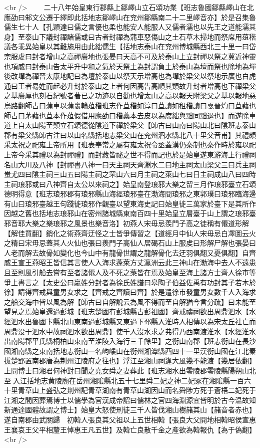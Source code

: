 <br />
　　二十八年始皇東行郡縣上鄒嶧山立石頌功業【班志魯國鄒縣嶧山在北應劭曰邾文公遷于繹即此括地志鄒嶧山在兖州鄒縣南二十二里嶧音亦】於是召集魯儒生七十人【孔穎達曰儒之言優也柔也能安人能服人又儒者濡也以先王之道能濡其身】至泰山下議封禪諸儒或曰古者封禪為蒲車惡傷山之土石草木掃地而祭席用葅稭議各乖異始皇以其難施用由此絀儒生【括地志泰山在兖州博城縣西北三十里一曰岱宗服䖍曰封者增山之高禪廣地也張晏曰天高不可及於泰山上立封禪以祭之冀近神靈也項威曰封泰山告太平升中和之氣於天祭土為封謂負土於泰山為壇而祭也除地為墠後改墠為禪晉太康地記曰為壇於泰山以祭天示增高也為墠於梁父以祭地示廣也白虎通曰王者易姓而起必升封於泰山之上者何因高告高順其類故升封者增高也下禪梁父之基廣厚也刻石紀號者著已之功迹以自勸也增太山之高以報天附梁父之基以報地惡烏路翻師古曰蒲車以蒲裹輪葅稭班志作苴稭如淳曰苴讀如租稭讀曰戛晉灼曰苴藉也師古曰茅藉也苴本作葅假借用應劭曰稭藁本去皮以為席絀與黜同黜退也】而遂除車道上自太山陽至顛立石頌德從隂道下禪於梁父【師古曰山南曰陽山北曰隂班志泰山郡有梁父縣師古注曰以山名縣括地志梁父山在兖州泗水縣北八十里父音甫】其禮頗采太祝之祀雍上帝所用【班表奉常之屬有雍太祝令丞蓋漢仍秦制也秦作畤於雍以祀上帝今采其禮以為封禪禮】而封藏皆祕之世不得而記也於是始皇遂東游海上行禮祠名山大川及八神【封禪書八神一曰天主祠天齊淵水二曰地主祠太山梁父三曰兵主祠蚩尤四曰隂主祠三山五曰陽主祠之罘山六曰月主祠之萊山七曰日主祠成山八曰四時主祠琅邪或曰八神齊自太公以來祠之】始皇南登琅邪大樂之留三月作琅邪臺立石頌德明得意【班志琅邪郡有琅邪縣山海經琅邪臺在渤海間琅邪之東郭璞曰琅邪臨海邊有山曰琅邪臺越王句踐徙琅邪作觀臺以望東海史記曰始皇徙三萬家於臺下是其所作因越之舊也括地志琅邪山在密州諸城縣東南百四十里始皇立層臺于山上謂之琅邪臺邪音耶大樂之樂琅邪之風景也樂音洛】初燕人宋毋忌羨門子高之徒稱有僊道形解【解佳買翻】銷化之術燕齊迂怪之士皆爭傳習之【道經月中仙人宋毋忌白凙圖云火之精曰宋毋忌蓋其人火仙也張曰羨門子高仙人居碣石山上服䖍曰形解尸解也張晏曰人老而解去故骨如變化也今山中有龍骨世謂之龍解骨化去迂羽俱翻又憂俱翻】自齊威王宣王燕昭王皆信其言使人入海求蓬萊方丈瀛洲云此三神山在渤海中去人不遠患且至則風引船去嘗有至者諸僊人及不死之藥皆在焉及始皇至海上諸方士齊人徐市等爭上書言之【太史公曰嬴姓分封者為徐氏姓譜曰皋陶子伯益佐禹有功封其子若木於徐】請得齊戒與童男女求之【齊戒之齊讀曰齊】於是遣徐市發童男女數千人入海求之船交海中皆以風為解【師古曰自解說云為風不得而至自解猶今言分疏】曰未能至望見之焉始皇還過彭城【班志楚國冇彭城縣古彭祖國】齊戒禱祠欲出周鼎泗水【水經泗水出魯國卞縣北山東南過彭城縣又東過下邳縣入淮時人相傳以為宋太丘社亡而周鼎没于泗水中故祠泗水欲出周鼎】使千人沒水求之弗得乃西南渡淮水【水經淮水出南陽郡平氏縣桐柏山東南至淮陵入海行三千餘里】之衡山南郡【班志衡山在長沙國湘南縣之東南括地志衡山一名岣嶁山在衡州湘潭縣西四十一里漢衡山國在江北秦拔楚郢置南郡唐為荆州江陵府之往也】浮江至湘山祠逢大風幾不能渡【幾居依翻】上問博士曰湘君何神對曰聞之堯女舜之妻葬此【班志湘水出零陵郡零陵縣陽朔山北至入江括地志黄陵廟在岳州湘隂縣北五十七里舜二妃之神二妃冢在湘隂縣一百六十里青草山上盛弘之荆州記青草湖南有青草山湖因山而名舜陟方死于蒼梧二妃死于江湘之間因葬焉博士以儒學為官漢成帝詔曰儒林之官四海淵源宜皆明於古今温故知新通達國體故謂之博士】始皇大怒使刑徒三千人皆伐湘山樹赭其山【赭音者赤也】遂自南郡由武關歸　初韓人張良其父祖以上五世相韓【張良大父開地相韓昭侯宣惠王襄哀王父平相釐王悼惠王凡五世】及韓亡良散千金之產欲為韓報仇【為于偽翻】<br />
